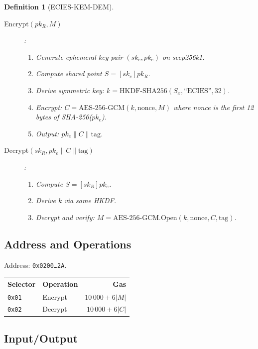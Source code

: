 \documentclass[11pt,a4paper]{article}
\newtheorem{definition}{Definition}
\begin{document}
\begin{definition}[ECIES-KEM-DEM]
\leavevmode
\begin{description}
  \item[Encrypt$(pk_R, M)$]:
    \begin{enumerate}
      \item Generate ephemeral key pair $(sk_e, pk_e)$ on secp256k1.
      \item Compute shared point $S = [sk_e] pk_R$.
      \item Derive symmetric key: $k = \text{HKDF-SHA256}(S_x, \text{``ECIES''}, 32)$.
      \item Encrypt: $C = \text{AES-256-GCM}(k, \text{nonce}, M)$ where nonce
        is the first 12 bytes of SHA-256($pk_e$).
      \item Output: $pk_e \| C \| \text{tag}$.
    \end{enumerate}
  \item[Decrypt$(sk_R, pk_e \| C \| \text{tag})$]:
    \begin{enumerate}
      \item Compute $S = [sk_R] pk_e$.
      \item Derive $k$ via same HKDF.
      \item Decrypt and verify: $M = \text{AES-256-GCM.Open}(k, \text{nonce}, C, \text{tag})$.
    \end{enumerate}
\end{description}
\end{definition}

\subsection{Address and Operations}

Address: \texttt{0x0200\ldots2A}.

\begin{table}[H]
\centering
\begin{tabular}{llr}
\toprule
\textbf{Selector} & \textbf{Operation} & \textbf{Gas} \\
\midrule
\texttt{0x01} & Encrypt & $10\,000 + 6|M|$ \\
\texttt{0x02} & Decrypt & $10\,000 + 6|C|$ \\
\bottomrule
\end{tabular}
\end{table}

\subsection{Input/Output}
\end{document}
